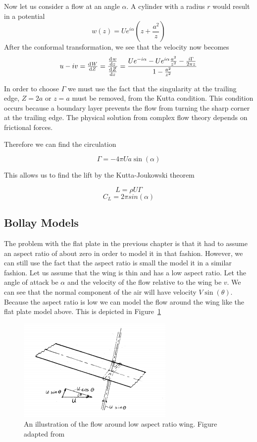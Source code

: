 Now let us consider a flow at an angle $\alpha$. A cylinder with a radius $r$
would result in a potential
\[w(z) = Ue^{i\alpha}(z + \frac{a^2}{z}) \]
After the conformal transformation, we see that the velocity now becomes
\[u - iv = \od{W}{Z} = \frac{\od{w}{z}}{\od{Z}{z}} = \frac{Ue^{-i\alpha}-Ue^{i\alpha}\frac{a^2}{z^2}
- \frac{i \Gamma}{2\pi z}}{1 - \frac{a^2}{z^2}}\]

In order to choose $\Gamma$ we must use the fact that the singularity at the trailing edge, 
$Z=2a$ or $z=a$ must be removed, from the Kutta condition. This condition occurs because 
a boundary layer prevents the flow from turning the sharp corner at the trailing edge.
The physical solution from complex flow theory depends on frictional forces.

Therefore we can find the circulation

\[ \Gamma = -4\pi Ua \sin(\alpha) \]

This allows us to find the lift by the Kutta-Joukowski theorem

\[L = \rho U \Gamma\]
\begin{equation}
\label{eq:flat_plat_cl}
C_L = 2\pi sin(\alpha)
\end{equation}

\subsection{Bollay Models}

The problem with the flat plate in the previous chapter is that it had to assume 
an aspect ratio of about zero in order to model it in that fashion. However, we can still
use the fact that the aspect ratio is small the model it in a similar fashion.
Let us assume that the wing is thin and has a low aspect ratio. Let the angle of attack
 be $\alpha$ and the velocity of the flow relative to the wing be $v$. 
 We can see that the normal component of the air
will have velocity $V\sin(\theta)$. Because the aspect ratio is low
we can model the flow around the wing like the flat plate model above.
This is depicted in Figure~\ref{fig:bollay1}

\begin{figure}[hl]
  \centering
    \includegraphics[scale=1]{figures/bollay1.png}
    \caption{An illustration of the flow around low aspect ratio wing. Figure adapted from~\cite{bollay}}
  \label{fig:bollay1}
\end{figure}


